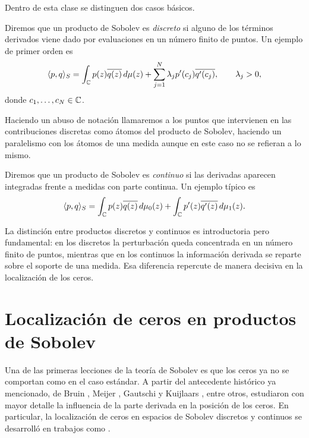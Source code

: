 Dentro de esta clase se distinguen dos casos básicos.

\begin{defn}\label{def:sobolev_discreto}
	Diremos que un producto de Sobolev es \emph{discreto} si alguno de los términos
	derivados viene dado por evaluaciones en un número finito de puntos. Un ejemplo de
	primer orden es
	\[
		\langle p,q\rangle_S
		=
		\int_{\mathbb{C}} p(z)\overline{q(z)}\,d\mu(z)
		+
		\sum_{j=1}^{N} \lambda_j p'(c_j)\overline{q'(c_j)},
		\qquad \lambda_j>0,
	\]
	donde \(c_1,\dots,c_N\in\mathbb{C}\).
\end{defn}

\begin{rmk}
	Haciendo un abuso de notación llamaremos a los puntos que intervienen en las contribuciones discretas como átomos del producto de Sobolev, haciendo un paralelismo con los átomos de una medida aunque en este caso no se refieran a lo mismo.
\end{rmk}

\begin{defn}\label{def:sobolev_continuo}
	Diremos que un producto de Sobolev es \emph{continuo} si las derivadas aparecen
	integradas frente a medidas con parte continua. Un ejemplo típico es
	\[
		\langle p,q\rangle_S
		=
		\int_{\mathbb{C}} p(z)\overline{q(z)}\,d\mu_0(z)
		+
		\int_{\mathbb{C}} p'(z)\overline{q'(z)}\,d\mu_1(z).
	\]
\end{defn}

La distinción entre productos discretos y continuos es introductoria pero
fundamental: en los discretos la perturbación queda concentrada en un número
finito de puntos, mientras que en los continuos la información derivada se reparte
sobre el soporte de una medida. Esa diferencia repercute de manera decisiva en la
localización de los ceros.

\section{Localización de ceros en productos de Sobolev}
\label{sec:localizacion_ceros_sobolev}

Una de las primeras lecciones de la teoría de Sobolev es que los ceros ya no se
comportan como en el caso estándar. A partir del antecedente histórico ya
mencionado, de Bruin \cite{deB93}, Meijer \cite{Mei93}, Gautschi y Kuijlaars
\cite{GK97}, entre otros, estudiaron con mayor detalle la influencia de la parte
derivada en la posición de los ceros. En particular, la localización de ceros en
espacios de Sobolev discretos y continuos se desarrolló en trabajos como
\cite{AMRR92,ALR96,lopez1999zero,lopez2001sobolev,RS08}.

